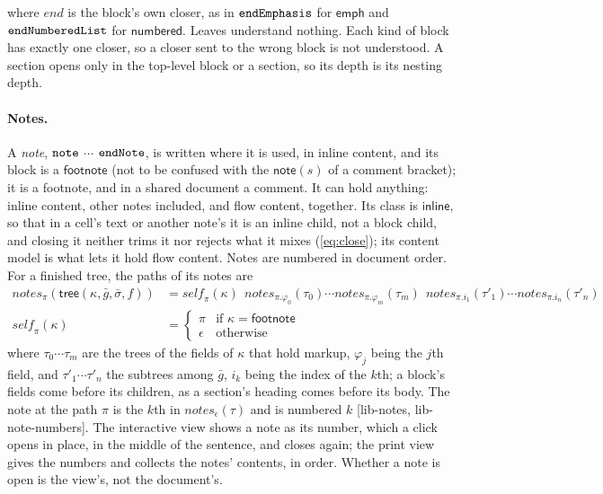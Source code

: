 \documentclass[11pt]{article}
\numberwithin{equation}{section}
\newcommand{\kw}[1]{\ensuremath{\mathsf{#1}}}
\newcommand{\str}[1]{\ensuremath{\text{\texttt{#1}}}}
\begin{document}
where $\mathit{end}$ is the block's own closer, as in
$\str{endEmphasis}$ for $\kw{emph}$ and $\str{endNumberedList}$ for
$\kw{numbered}$.  Leaves understand nothing.  Each kind of block has
exactly one closer, so a closer sent to the wrong block is not understood.
A section opens only in the top-level block or a section, so its depth is
its nesting depth.

\paragraph{Notes.}  A \emph{note}, $\str{note}$ $\cdots$ $\str{endNote}$, is
written where it is used, in inline content, and its block is a
$\kw{footnote}$ (not to be confused with the $\kw{note}(s)$ of a comment
bracket); it is a footnote, and in a
shared document a comment.  It can hold anything: inline content, other
notes included, and flow content, together.  Its class is $\kw{inline}$, so
that in a cell's text or another note's it is an inline child, not a block
child, and closing it neither trims it nor rejects what it mixes
(\ref{eq:close}); its content model is what lets it hold flow content.
Notes are numbered in document order.  For a finished tree, the paths of its notes
are
\begin{equation}\label{eq:lib-note-numbers}
\begin{aligned}
\mathit{notes}_\pi(\kw{tree}(\kappa, \bar g, \bar\sigma, f)) &=
  \mathit{self}_\pi(\kappa)\ \
  \mathit{notes}_{\pi.\varphi_0}(\tau_0) \cdots
  \mathit{notes}_{\pi.\varphi_m}(\tau_m)\ \
  \mathit{notes}_{\pi.i_1}(\tau'_1) \cdots \mathit{notes}_{\pi.i_n}(\tau'_n)
\\
\mathit{self}_\pi(\kappa) &=
  \begin{cases} \pi & \text{if } \kappa = \kw{footnote} \\
    \epsilon & \text{otherwise} \end{cases}
\end{aligned}
\end{equation}
where $\tau_0 \cdots \tau_m$ are the trees of the fields of $\kappa$ that
hold markup, $\varphi_j$ being the $j$th field, and $\tau'_1 \cdots \tau'_n$
the subtrees among $\bar g$, $i_k$ being the index of the $k$th; a block's
fields come before its children, as a section's heading comes before its
body.  The note at the path $\pi$ is the $k$th in
$\mathit{notes}_\epsilon(\tau)$ and is numbered $k$ [lib-notes,
lib-note-numbers].  The interactive view shows a note as its number, which a
click opens in place, in the middle of the sentence, and closes again; the
print view gives the numbers and collects the notes' contents, in order.
Whether a note is open is the view's, not the document's.
\end{document}
